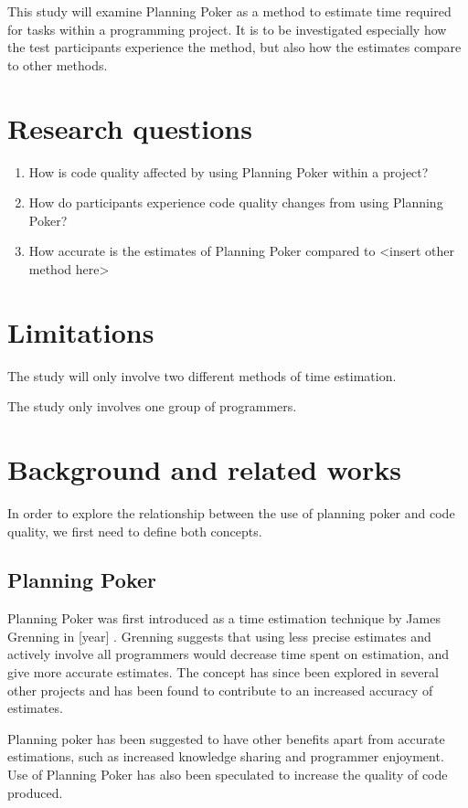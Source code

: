 \documentclass{sigchi}
\begin{document}
This study will examine Planning Poker as a method to estimate time required for tasks within a programming project. It is to be investigated especially how the test participants experience the method, but also how the estimates compare to other methods.

\section{Research questions}
\begin{enumerate}
	\item How is code quality affected by using Planning Poker within a project?
	\item How do participants experience code quality changes from using Planning Poker?

	\item How accurate is the estimates of Planning Poker compared to <insert other method here>

\end{enumerate}

\section{Limitations}
The study will only involve two different methods of time estimation.

The study only involves one group of programmers.

\section{Background and related works}
In order to explore the relationship between the use of planning poker and code quality, we first need to define both concepts.

\subsection{Planning Poker}
Planning Poker was first introduced as a time estimation technique by James Grenning in [year] \cite{grenning2002planning}.
Grenning suggests that using less precise estimates and actively involve all programmers would
decrease time spent on estimation, and give more accurate estimates. The concept has since been
explored in several other projects and has been found to contribute to an increased accuracy of
estimates\cite{Mahni20122086,1667560}.

Planning poker has been suggested to have other benefits apart from accurate estimations, such as increased knowledge sharing and programmer enjoyment\cite{molokken2008using}. Use of Planning Poker has also been speculated to increase the quality of code produced\cite{molokken2007combining}.
\end{document}
